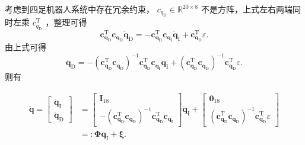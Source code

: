 考虑到四足机器人系统中存在冗余约束， $c_{q_{\mathrm{D}}} \in \mathbb{R}^{20 \times 8}$  不是方阵，上式左右两端同时左乘  $c_{q_{\mathrm{D}}}^{\mathrm{T}}$  ，整理可得
\[
\boldsymbol{c}_{\boldsymbol{q}_{\mathrm{D}}}^{\mathrm{T}} \boldsymbol{c}_{\boldsymbol{q}_{\mathrm{D}}} \ddot{\boldsymbol{q}}_{\mathrm{D}}=-\boldsymbol{c}_{\boldsymbol{q}_{\mathrm{D}}}^{\mathrm{T}} \boldsymbol{c}_{\boldsymbol{q}_{\mathrm{I}}} \ddot{\boldsymbol{q}}_{\mathrm{I}}+\boldsymbol{c}_{\boldsymbol{q}_{\mathrm{D}}}^{\mathrm{T}} \varepsilon .
\]
由上式可得
\[
\ddot{\boldsymbol{q}}_{\mathrm{D}}=-\left(\boldsymbol{c}_{\boldsymbol{q}_{\mathrm{D}}}^{\mathrm{T}} \boldsymbol{c}_{\boldsymbol{q}_{\mathrm{D}}}\right)^{-1} \boldsymbol{c}_{\boldsymbol{q}_{\mathrm{D}}}^{\mathrm{T}} \boldsymbol{c}_{\boldsymbol{q}_{\mathrm{I}}} \ddot{\boldsymbol{q}}_{\mathrm{I}}+\left(\boldsymbol{c}_{\boldsymbol{q}_{\mathrm{D}}}^{\mathrm{T}} \boldsymbol{c}_{\boldsymbol{q}_{\mathrm{D}}}\right)^{-1} \boldsymbol{c}_{\boldsymbol{q}_{\mathrm{D}}}^{\mathrm{T}} \varepsilon .
\]
则有

\[
\begin{aligned}
\ddot{\boldsymbol{q}}=\left[\begin{array}{c}
\ddot{\boldsymbol{q}}_{\mathrm{I}} \\
\ddot{\boldsymbol{q}}_{\mathrm{D}}
\end{array}\right] & =\left[\begin{array}{c}
\boldsymbol{I}_{18} \\
-\left(\boldsymbol{c}_{\boldsymbol{q}_{\mathrm{D}}}^{\mathrm{T}} \boldsymbol{c}_{\boldsymbol{q}_{\mathrm{D}}}\right)^{-1} \boldsymbol{c}_{\boldsymbol{q}_{\mathrm{D}}}^{\mathrm{T}} \boldsymbol{c}_{\boldsymbol{q}_{\mathrm{I}}}
\end{array}\right] \ddot{\boldsymbol{q}}_{\mathrm{I}}+\left[\begin{array}{c}
\mathbf{0}_{18} \\
\left(\boldsymbol{c}_{\boldsymbol{q}_{\mathrm{D}}}^{\mathrm{T}} \boldsymbol{c}_{\boldsymbol{q}_{\mathrm{D}}}\right)^{-1} \boldsymbol{c}_{\boldsymbol{q}_{\mathrm{D}}}^{\mathrm{T}} \varepsilon
\end{array}\right] \\
& =: \boldsymbol{\Phi} \ddot{\boldsymbol{q}}_{\mathrm{I}}+\boldsymbol{\xi} .
\end{aligned}
\]

